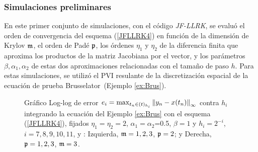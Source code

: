 \subsubsection{Simulaciones preliminares}
En este primer conjunto de simulaciones, con el código \textit{JF-LLRK}, se evaluó el orden de convergencia del esquema (\ref{JFLLRK4}) en función de la dimensión de Krylov $\mathfrak{m}$, el orden de Padé $\mathfrak{p}$, los órdenes $\eta_1$ y $\eta_2$ de la diferencia finita que aproxima los productos de la matriz Jacobiana por el vector, y los parámetros $\beta,\alpha_1,\alpha_2$ de estas dos aproximaciones relacionadas con el tamaño de paso $h$. Para estas simulaciones, se utilizó el PVI resulante de la discretización espacial de la ecuación de prueba  Brusselator~(Ejemplo \ref{ex:Brus}).

\begin{figure}[htb]
	\centering
	\caption{Gráfico Log-log de error ${e_i=\max_{t_n\in(t)_{h_i}}\left\lVert y_n-x(t_n) \right\rVert_\infty}$ contra $h_i$ integrando la ecuación del Ejemplo \ref{ex:Brus} con el esquema (\ref{JFLLRK4}), fijados $\eta_1=\eta_2=2$, $\alpha_1=\alpha_2$=0.5, $\beta=1$ y $h_i=2^{-i}$, $i=7,8,9,10,11$, y : Izquierda, $\mathfrak{m}=1,2,3$, $\mathfrak{p}=2$; y Derecha, $\mathfrak{p}=1,2,3$, $\mathfrak{m}=3$.} \label{Fig1}
\end{figure}

